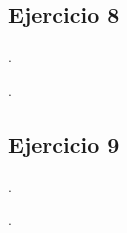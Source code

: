 \begin{Enunciado}
	\subsection*{Ejercicio 8}
    
	\lipsum[1].
\end{Enunciado}
\vspace*{1em}
\lipsum[1].
\vspace*{2em}
\begin{Enunciado}
	\subsection*{Ejercicio 9}
    
	\lipsum[1].
\end{Enunciado}
\vspace*{1em}
\lipsum[1].


